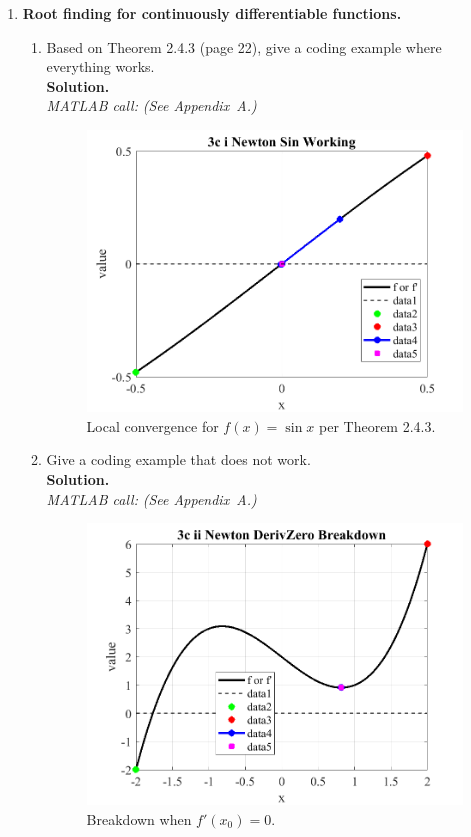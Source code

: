 \documentclass[11pt]{article}
\begin{document}
\begin{enumerate}[label=3(\alph*)]
\begin{enumerate}[label=\roman*)]
		\end{enumerate}
		
		\item \textbf{Root finding for continuously differentiable functions.}
		\begin{enumerate}[label=\roman*)]
			
			\item Based on Theorem 2.4.3 (page 22), give a coding example where everything works.\\
			\textbf{Solution.}\\
			\textit{MATLAB call:} \emph{(See Appendix~A.)}
			
			\begin{figure}[H]\centering
				\includegraphics[width=0.78\linewidth]{plots/3c_i_Newton_Sin_Working.png}
				\caption{Local convergence for \(f(x)=\sin x\) per Theorem 2.4.3.}
			\end{figure}
			
			\item Give a coding example that does not work.\\
			\textbf{Solution.}\\
			\textit{MATLAB call:} \emph{(See Appendix~A.)}
			
			\begin{figure}[H]\centering
				\includegraphics[width=0.78\linewidth]{plots/3c_ii_Newton_DerivZero_Breakdown.png}
				\caption{Breakdown when \(f'(x_0)=0\).}
			\end{figure}
			

\end{enumerate}
\end{enumerate}
\end{document}
